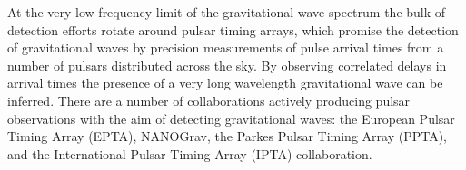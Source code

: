 At the very low-frequency limit of the gravitational wave spectrum the
bulk of detection efforts rotate around pulsar timing arrays, which
promise the detection of gravitational waves by precision measurements
of pulse arrival times from a number of pulsars distributed across the
sky. By observing correlated delays\cite{1983ApJ...265L..39H} in
arrival times the presence of a very long wavelength gravitational
wave can be inferred. There are a number of collaborations actively
producing pulsar observations with the aim of detecting gravitational
waves: the European Pulsar Timing Array
(EPTA)\cite{2013CQGra..30v4009K}, NANOGrav\cite{2009arXiv0909.1058J},
the Parkes Pulsar Timing Array (PPTA)\cite{2013PASA...30...17M}, and
the International Pulsar Timing Array (IPTA)
collaboration\cite{2013CQGra..30v4010M}.


